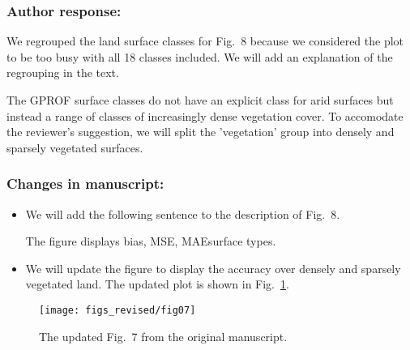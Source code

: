 \subsubsection*{Author response:}

We regrouped the land surface classes for Fig.~8 because we considered the plot
to be too busy with all 18 classes included. We will add an explanation of the
regrouping in the text.

The GPROF surface classes do not have an explicit class for arid surfaces but
instead a range of classes of increasingly dense vegetation cover. To accomodate
the reviewer's suggestion, we will split the 'vegetation' group into densely and
sparsely vegetated surfaces.

\subsubsection*{Changes in manuscript:}

\begin{itemize}
  \item We will add the following sentence to the description of Fig.~8.

    \begin{change}[323]
      The figure displays bias, MSE, MAE\DIFdelbegin {}\DIFdelend \DIFaddbegin {}\DIFaddend surface types. \DIFaddbegin
      \DIFaddend
      \end{change}

    \item We will update the figure to display the accuracy over densely and sparsely
      vegetated land. The updated plot is shown in Fig.~\ref{fig:results_surface_types}.

 \end{itemize}

      \begin{figure}[hbpt]
        \centering
        \texttt{[image: figs\_revised/fig07]}
        \caption{
          The updated Fig.~7 from the original manuscript.
        }
        \label{fig:results_surface_types}
      \end{figure}


